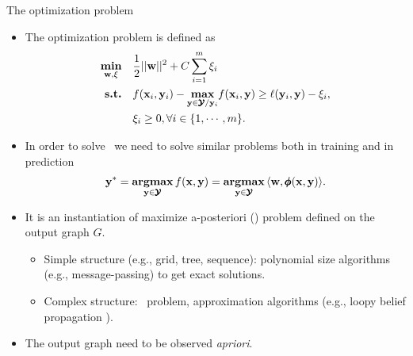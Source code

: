 \documentclass[first=dgreen,second=purple,logo=yellowexc]{aaltoslides}
\begin{document}
{\begin{frame}{The optimization problem}
	\begin{itemize}
		\item The optimization problem is defined as
		\begin{align*}
			\underset{\mathbf {w},\mathbf{\xi}}{\textbf{min}} &\quad {\frac{1}{2}||\mathbf {w}||^2} + {C\sum_{i=1}^m\xi_i}\\
			\textbf{s.t.} &\quad f(\mathbf {x}_i,\mathbf {y}_i) - \underset{\mathbf {y}\in\pmb {\mathcal{Y}}/\mathbf {y}_i}{\textbf{max}}f(\mathbf {x}_i,\mathbf {y}) \ge \ell(\mathbf {y}_i,\mathbf {y}) - \xi_i,\\
			&\quad \xi_i\ge0, \forall i\in\{1,\cdots,m\}.
		\end{align*}
		\item In order to solve \mmcrf\ we need to solve similar problems both in training and in prediction
		\begin{align*}
			\mathbf {y}^*= \underset{\mathbf {y}\in\pmb {\mathcal{Y}}}{\textbf{argmax}} \, f(\mathbf {x},\mathbf {y}) =  \underset{\mathbf {y}\in\pmb {\mathcal{Y}}}{\textbf{argmax}} \,\langle \mathbf {w}, \pmb \phi(\mathbf {x},\mathbf {y}) \rangle.
		\end{align*}
		\item It is an instantiation of maximize a-posteriori (\map) problem defined on the output graph $G$.
		\begin{itemize}
			\footnotesize
			\item Simple structure (e.g., grid, tree, sequence): polynomial size algorithms (e.g., message-passing) to get exact solutions.
			\item Complex structure: \nphard\ problem, approximation algorithms (e.g., loopy belief propagation \citep{Wainwright08graphical}). 
		\end{itemize}
		\item The output graph need to be observed \textit{apriori}.
	\end{itemize}
\end{frame}


}
\end{document}
